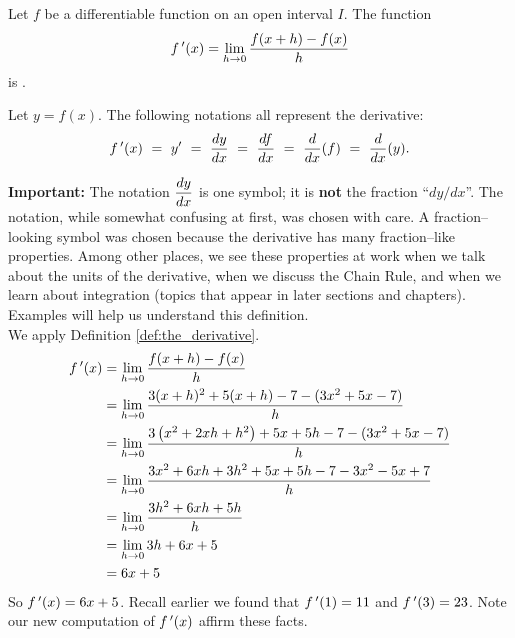{Let $f$ be a differentiable function on an open interval $I$. The function $$f\,'(x) = \lim_{h\to 0} \frac{f(x+h)-f(x)}{h}$$ is .\\


Let $y = f(x)$. The following notations all represent the derivative:
$$\fp(x)\ =\ y'\ =\ \frac{dy}{dx}\ =\ \frac{df}{dx}\ =\ \frac{d}{dx}(f)\ =\ \frac{d}{dx}(y). $$}
\setlength{\specialboxlength}{\textwidth-2\specialboxinnerseplength}

\noindent\textbf{Important:} The notation $\displaystyle \frac{dy}{dx}$ is one symbol; it is \textbf{not} the fraction ``$dy/dx$''. The notation, while somewhat confusing at first, was chosen with care. A fraction--looking symbol was chosen because the derivative has many fraction--like properties. Among other places, we see these properties at work when we talk about the units of the derivative, when we discuss the Chain Rule, and when we learn about integration (topics that appear in later sections and chapters).\\

Examples will help us understand this definition.\\

{We apply Definition \ref{def:the_derivative}.
	\begin{align*}
	f\,'(x) &= \lim_{h\to 0} \frac{f(x+h)-f(x)}{h} \\
					&=	\lim_{h\to 0} \frac{3(x+h)^2+5(x+h)-7-(3x^2+5x-7)}{h}\\
					&=	\lim_{h\to 0} \frac{3\left(x^2+2xh+h^2\right)+5x+5h-7-(3x^2+5x-7)}{h}\\
					&=	\lim_{h\to 0} \frac{3x^2+6xh+3h^2+5x+5h-7-3x^2-5x+7}{h}\\
					&=	\lim_{h\to 0} \frac{3h^2 +6xh+5h}{h}\\
					&= \lim_{h\to 0} 3h+6x+5\\
					&= 6x+5
	\end{align*}
	So $f\,'(x) = 6x+5$. Recall earlier we found that $f\,'(1) = 11$ and $f\,'(3) = 23$. Note our new computation of $f\,'(x)$ affirm these facts.
}\\

